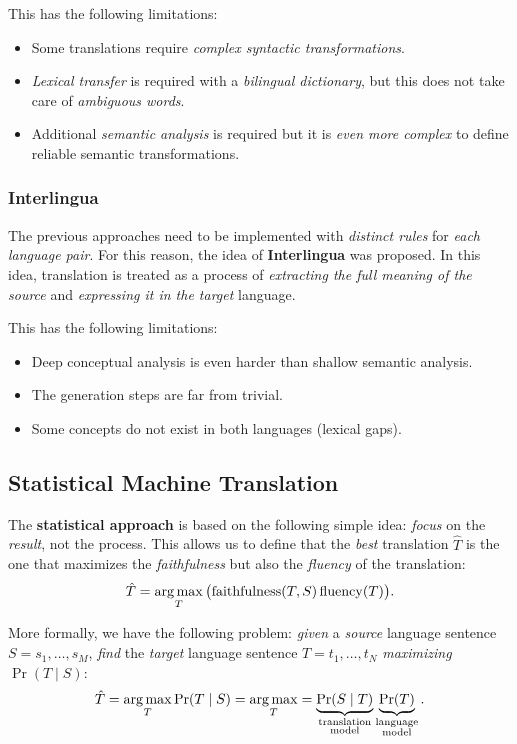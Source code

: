 This has the following limitations:
\begin{itemize}
	\item Some translations require \emph{complex syntactic transformations}.
	\item \emph{Lexical transfer} is required with a \emph{bilingual dictionary}, but this does not take care of \emph{ambiguous words}.
	\item Additional \emph{semantic analysis} is required but it is \emph{even more complex} to define reliable semantic transformations.
\end{itemize}

\subsubsection{Interlingua}
The previous approaches need to be implemented with \emph{distinct rules} for \emph{each language pair}.
For this reason, the idea of \textbf{Interlingua} was proposed.
In this idea, translation is treated as a process of \emph{extracting the full meaning of the source} and \emph{expressing it in the target} language.

This has the following limitations:
\begin{itemize}
	\item Deep conceptual analysis is even harder than shallow semantic analysis.
	\item The generation steps are far from trivial.
	\item Some concepts do not exist in both languages (lexical gaps).
\end{itemize}

\subsection{Statistical Machine Translation}
The \textbf{statistical approach} is based on the following simple idea: \emph{focus} on the \emph{result}, not the process.
This allows us to define that the \emph{best} translation \(\hat{T}\) is the one that maximizes the \emph{faithfulness} but also the \emph{fluency} of the translation:
\[
\hat{T} = \operatorname*{arg\,max}_{T} \big(\mathrm{faithfulness}(T, S) \, \mathrm{fluency}(T)\big).
\]

More formally, we have the following problem: \emph{given} a \emph{source} language sentence \(S = s_1, \dots, s_M\), \emph{find} the \emph{target} language sentence \(T = t_1, \dots, t_N\) \emph{maximizing} \(\Pr(T \mid S)\):
\[
\hat{T} = \operatorname*{arg\,max}_{T} \Pr(T \mid S) = \operatorname*{arg\,max}_T = \underbrace{\Pr(S \mid T)}_{\substack{\textnormal{translation} \\ \textnormal{model}}} \underbrace{\Pr(T)}_{\substack{\textnormal{language} \\ \textnormal{model}}}.
\]

